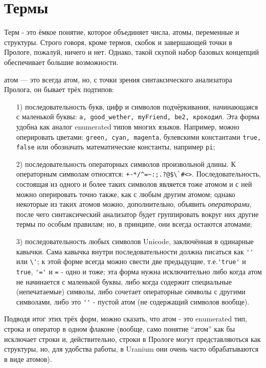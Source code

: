 \documentclass[a4paper]{book}
\def\te{т.\thinspace е.}
\def\ur{Uranium}
\begin{document}
\section{Термы}
\label{terms}

Терм - это ёмкое понятие, которое объединяет числа, атомы,
переменные и структуры. Строго говоря, кроме термов, скобок и
завершающей точки в Прологе, пожалуй, ничего и нет. Однако, такой
скупой набор базовых концепций обеспечивает большие возможности.

\begin{description}
\item атом --- это всегда атом, но, с точки зрения синтаксического
  анализатора Пролога, он бывает трёх подтипов:
  \begin{itemize}
    \item[1)] последовательность букв, цифр и символов
      подчёркивания, начинающаяся с маленькой буквы:
      \verb|a, good_wether, myFriend, be2, крокодил|. Эта форма
      удобна как аналог enumerated типов многих языков. Например,
      можно оперировать цветами: \verb|green, cyan, magenta|,
      булевскими константами \verb|true, false| или обозначать
      математические константы, например \verb|pi|;
    \item[2)] последовательность операторных символов
      произвольной длины. К операторным символам относятся:
      \verb|+-*/^=~:;.?@$\`#<>|. Последовательность, состоящая из
      одного и более таких символов является тоже атомом и с ней
      можно оперировать точно также, как с любым другим атомом;
      однако некоторые из таких атомов можно, дополнительно,
      объявить {\it операторами\/}, после чего синтаксический
      анализатор будет группировать вокруг них другие термы по
      особым правилам; но, в принципе, они всегда остаются атомами;
    \item[3)] последовательность любых символов Unicode,
      заключённая в одинарные кавычки. Сама кавычка внутри
      последовательности должна писаться как \verb|''| или
      \verb|\'|; к этой форме всегда можно свести две предыдущие,
      \te \verb|'true'| и \verb|true|, \verb|'='| и \verb|=| -
      одно и тоже; эта форма нужна исключительно либо когда атом
      не начинается с маленькой буквы, либо когда содержит
      специальные (непечатаемые) символы, либо сочетает
      операторные символы с другими символами, либо это \verb|''|
      - пустой атом (не содержащий символов вообще). 
  \end{itemize}
  Подводя итог этих трёх форм, можно сказать, что атом - это
  enumerated тип, строка и оператор в одном флаконе (вообще, само
  понятие ``атом'' как бы исключает строки и, действительно,
  строки в Прологе могут представляються как структуры, но,
  для удобства работы, в \ur{} они очень часто обрабатываются в
  виде атомов).


\end{description}
\end{document}

